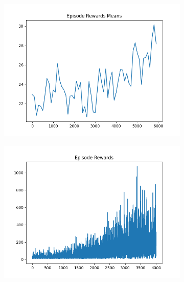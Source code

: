 \begin{figure}[H]
\begin{subfigure}{.47\linewidth}
        \includegraphics[width=\textwidth]{pole/2024-06-14_17-31-42_dqn_cartpole_episode_rewards_means.png}
    \end{subfigure}
    \begin{subfigure}{.47\linewidth}
        \centering
        \includegraphics[width=\textwidth]{pole/2024-06-13_23-49-30_dqn_cartpole_episode_rewards.png}
    \end{subfigure}
\end{figure}
